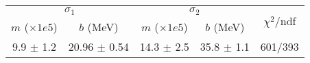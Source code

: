 \begin{tabular}{cc|cc||c}
\multicolumn{2}{c|}{$\sigma_1$} & \multicolumn{2}{|c}{$\sigma_2$}  & \multirow{2}{*}{$\chi^2/$ndf}\\
$m$ ($\times1e5$) & $b$ (MeV) & $m$ ($\times1e5$) & $b$ (MeV)  & \\
\hline
9.9 $\pm$ 1.2 & 20.96 $\pm$ 0.54 & 14.3 $\pm$ 2.5 & 35.8 $\pm$ 1.1 & 601/393\\
\end{tabular}
